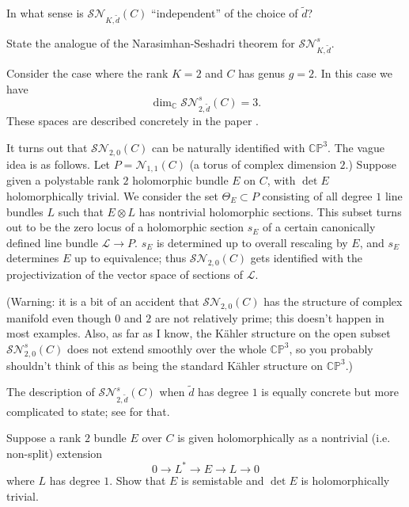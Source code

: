 \documentclass[12pt,letterpaper,reqno]{article}
\numberwithin{equation}{section}
\newcommand{\cL}{\ensuremath{\mathcal L}}
\newcommand{\cS}{\ensuremath{\mathcal S}}
\newcommand{\cN}{\ensuremath{\mathcal N}}
\newcommand{\C}{\ensuremath{\mathbb C}}
\newcommand{\PP}{\ensuremath{\mathbb P}}
\newcommand{\kahler}{K\"ahler\xspace}
\begin{document}
\begin{exercise} In what sense is $\cS\cN_{K,\tilde d}(C)$ ``independent''
of the choice of $\tilde d$?
\end{exercise}

\begin{exercise} State the analogue of the Narasimhan-Seshadri theorem
for $\cS\cN^s_{K,\tilde d}$.
\end{exercise}


\begin{example} Consider the case where the rank $K=2$ and
$C$ has genus $g = 2$. In this case we have
\begin{equation}
\dim_\C \cS\cN^s_{2,\tilde d}(C) = 3.
\end{equation}
These spaces are described concretely
in the paper \cite{MR0242185}.

It turns out that
$\cS\cN_{2,0}(C)$ can be naturally identified with $\C\PP^3$.
The vague idea is as follows.
Let $P = \cN_{1,1}(C)$ (a torus of complex dimension $2$.)
Suppose given a polystable rank $2$ holomorphic bundle $E$ on $C$, with
$\det E$ holomorphically trivial.
We consider the set $\Theta_E \subset P$ consisting of all degree
$1$ line bundles $L$ such that $E \otimes L$ has nontrivial holomorphic
sections. This subset turns out to be the zero locus of a holomorphic
section $s_E$ of
a certain canonically defined line bundle $\cL \to P$.
$s_E$ is determined up to overall rescaling by $E$, and
$s_E$ determines $E$ up to equivalence; thus
$\cS\cN_{2,0}(C)$ gets identified with the projectivization
of the vector space of sections of $\cL$.

(Warning: it is a bit of an accident that $\cS\cN_{2,0}(C)$
has the structure of complex manifold even though $0$ and $2$
are not relatively prime; this doesn't happen in most
examples. Also, as far as I know,
the \kahler structure on the open subset $\cS\cN^s_{2,0}(C)$
does not extend smoothly over the whole $\C\PP^3$, so you probably
shouldn't think of this as being the standard \kahler structure on
$\C\PP^3$.)

The description of $\cS\cN^s_{2,\tilde d}(C)$ when $\tilde d$ has degree
$1$ is equally concrete but more complicated to state; see \cite{MR0242185}
for that.

\end{example}


\begin{exercise} Suppose
a rank $2$ bundle $E$ over $C$ is given holomorphically as a
nontrivial (i.e. non-split) extension
\begin{equation}
0 \to L^* \to E \to L \to 0
\end{equation}
where $L$ has degree $1$.
Show that $E$ is semistable and $\det E$ is holomorphically trivial.
\end{exercise}
\end{document}
